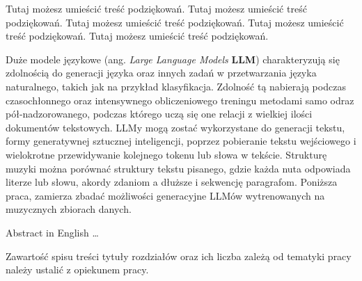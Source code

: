 \documentclass[data-science]{agh-wi} %
\author{Filip Ręka}
\begin{document}
\frontmatter %
\maketitle %
\cleardoublepage
\thispagestyle{empty}
\vspace*{\fill}
\begin{flushright}
    \em
    \begin{minipage}{0.75\textwidth}
        Tutaj możesz umieścić treść podziękowań.
        Tutaj możesz umieścić treść podziękowań.
        Tutaj możesz umieścić treść podziękowań.
        Tutaj możesz umieścić treść podziękowań.
        Tutaj możesz umieścić treść podziękowań.
    \end{minipage}
\end{flushright}
\begin{abstractPL}
    Duże modele językowe (ang. \textit{Large Language Models} \textbf{LLM}) charakteryzują się zdolnością do generacji języka oraz innych zadań w przetwarzania języka naturalnego, takich jak na przykład klasyfikacja. Zdolność tą nabierają podczas czasochłonnego oraz intensywnego obliczeniowego treningu metodami samo odraz pół-nadzorowanego, podczas którego uczą się one relacji z wielkiej ilości dokumentów tekstowych. LLMy mogą zostać wykorzystane do generacji tekstu, formy generatywnej sztucznej inteligencji, poprzez pobieranie tekstu wejściowego i wielokrotne przewidywanie kolejnego tokenu lub słowa w tekście. Strukturę muzyki można porównać struktury tekstu pisanego, gdzie każda nuta odpowiada literze lub słowu, akordy zdaniom a dłuższe i sekwencję paragrafom. Poniższa praca, zamierza zbadać możliwości generacyjne LLMów wytrenowanych na muzycznych zbiorach danych.
\end{abstractPL}
\begin{abstractEN}
    Abstract in English \cite{attention} \ldots
\end{abstractEN}
\setcounter{tocdepth}{5}

\begin{shaded}
    Zawartość spisu treści \pauza tytuły rozdziałów oraz ich liczba zależą od tematyki pracy \pauza należy ustalić z opiekunem pracy.
\end{shaded}
\listoffigures     %
\listoftables      %
\listofalgorithms  %
\lstlistoflistings %
\printnomenclature %
\mainmatter %
\end{document}
